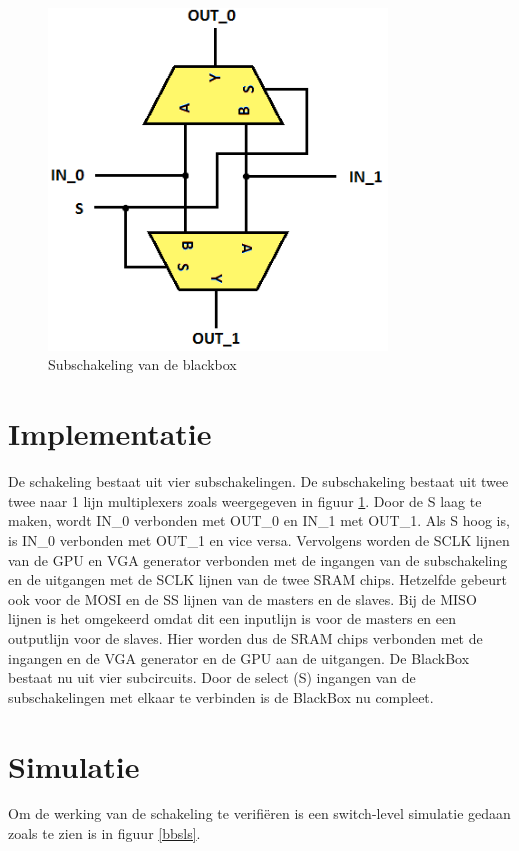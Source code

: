 \documentclass[oneside,dutch]{tudelft-report}
\begin{document}
\begin{figure}[H]
\center
\includegraphics[width=9cm]{./BlackBox_Circuit}
\caption{Subschakeling van de blackbox}
\label{sub-blackbox}
\end{figure}

\section{Implementatie}
De schakeling bestaat uit vier subschakelingen. De subschakeling bestaat uit twee twee naar 1 lijn multiplexers zoals weergegeven in figuur \ref{sub-blackbox}. Door de S laag te maken, wordt IN\_0 verbonden met OUT\_0 en IN\_1 met OUT\_1. Als S hoog is, is IN\_0 verbonden met OUT\_1 en vice versa. Vervolgens worden de SCLK lijnen van de GPU en VGA generator verbonden met de ingangen van de subschakeling en de uitgangen met de SCLK lijnen van de twee SRAM chips. Hetzelfde gebeurt ook voor de MOSI en de SS lijnen van de masters en de slaves. Bij de MISO lijnen is het omgekeerd omdat dit een inputlijn is voor de masters en een outputlijn voor de slaves. Hier worden dus de SRAM chips verbonden met de ingangen en de VGA generator en de GPU aan de uitgangen. De BlackBox bestaat nu uit vier subcircuits. Door de select (S) ingangen van de subschakelingen met elkaar te verbinden is de BlackBox nu compleet.
\section{Simulatie}
Om de werking van de schakeling te verifiëren is een switch-level simulatie gedaan zoals te zien is in figuur \ref{bbsls}. 
\end{document}
